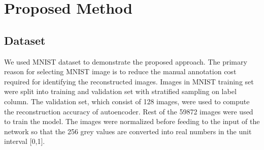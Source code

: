 \documentclass[journal]{IEEEtran}
\begin{document}
\section{Proposed Method} \label{proposed_method}
\subsection{Dataset}
We used MNIST dataset\cite{mnist} to demonstrate the proposed approach. The primary reason for selecting MNIST image is to reduce the manual annotation cost required for identifying the reconstructed images. Images in MNIST training set were split into training and validation set with stratified sampling on label column. The validation set, which consist of 128 images, were used to compute the reconstruction accuracy of autoencoder. Rest of the 59872 images were used to train the model. The images were normalized  before feeding to the input of the network so that the 256 grey values are converted into real numbers in the unit interval [0,1].
\end{document}
